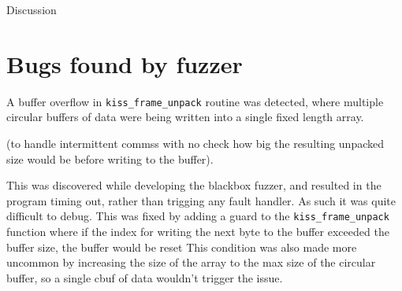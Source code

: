 \documentclass[../report.tex]{subfiles}
\begin{document}
Discussion






\section{Bugs found by fuzzer}

A buffer overflow in \lstinline|kiss_frame_unpack| routine was detected, where multiple
circular buffers of data were being written into a single fixed length array.

(to handle intermittent commss with no check how big the resulting unpacked
size would be before writing to the buffer).

This was discovered while developing the blackbox fuzzer, and resulted in the
program timing out, rather than trigging any fault handler. As such it was
quite difficult to debug. This was fixed by adding a guard to the
\lstinline|kiss_frame_unpack| function where if the index for writing the next
byte to the buffer exceeded the buffer size, the buffer would be reset This
condition was also made more uncommon by increasing the size of the array to
the max size of the circular buffer, so a single cbuf of data wouldn't trigger
the issue.
\end{document}
